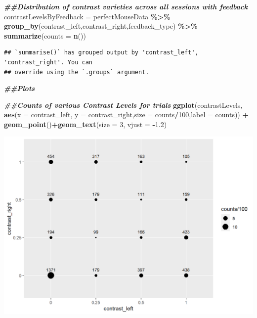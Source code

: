 \documentclass[
]{article}
\newenvironment{Shaded}{\begin{snugshade}}{\end{snugshade}}
\newcommand{\AttributeTok}[1]{\textcolor[rgb]{0.13,0.29,0.53}{#1}}
\newcommand{\DecValTok}[1]{\textcolor[rgb]{0.00,0.00,0.81}{#1}}
\newcommand{\DocumentationTok}[1]{\textcolor[rgb]{0.56,0.35,0.01}{\textbf{\textit{#1}}}}
\newcommand{\FloatTok}[1]{\textcolor[rgb]{0.00,0.00,0.81}{#1}}
\newcommand{\FunctionTok}[1]{\textcolor[rgb]{0.13,0.29,0.53}{\textbf{#1}}}
\newcommand{\NormalTok}[1]{#1}
\newcommand{\OtherTok}[1]{\textcolor[rgb]{0.56,0.35,0.01}{#1}}
\newcommand{\SpecialCharTok}[1]{\textcolor[rgb]{0.81,0.36,0.00}{\textbf{#1}}}
\begin{document}
\begin{Shaded}
\begin{Highlighting}[]
\DocumentationTok{\#\#Distribution of contrast varieties across all sessions with feedback}
\NormalTok{contrastLevelsByFeedback }\OtherTok{=}\NormalTok{ perfectMouseData }\SpecialCharTok{\%\textgreater{}\%} \FunctionTok{group\_by}\NormalTok{(contrast\_left,contrast\_right,feedback\_type) }\SpecialCharTok{\%\textgreater{}\%} \FunctionTok{summarize}\NormalTok{(}\AttributeTok{counts =} \FunctionTok{n}\NormalTok{()) }
\end{Highlighting}
\end{Shaded}

\begin{verbatim}
## `summarise()` has grouped output by 'contrast_left', 'contrast_right'. You can
## override using the `.groups` argument.
\end{verbatim}

\begin{Shaded}
\begin{Highlighting}[]
\DocumentationTok{\#\#Plots}

\DocumentationTok{\#\#Counts of various Contrast Levels for trials}
\FunctionTok{ggplot}\NormalTok{(contrastLevels, }\FunctionTok{aes}\NormalTok{(}\AttributeTok{x =}\NormalTok{ contrast\_left, }\AttributeTok{y =}\NormalTok{ contrast\_right,}\AttributeTok{size =}\NormalTok{ counts}\SpecialCharTok{/}\DecValTok{100}\NormalTok{,}\AttributeTok{label =}\NormalTok{ counts)) }\SpecialCharTok{+}
  \FunctionTok{geom\_point}\NormalTok{()}\SpecialCharTok{+}\FunctionTok{geom\_text}\NormalTok{(}\AttributeTok{size =} \DecValTok{3}\NormalTok{, }\AttributeTok{vjust =} \SpecialCharTok{{-}}\FloatTok{1.2}\NormalTok{)}
\end{Highlighting}
\end{Shaded}

\includegraphics{images/unnamed-chunk-10-1.png}
\end{document}

